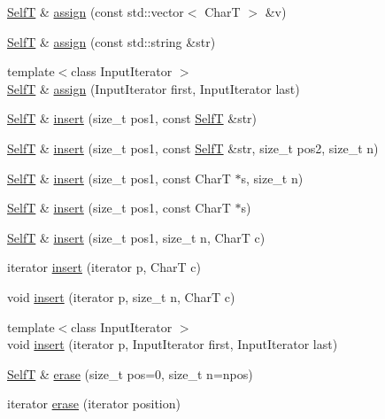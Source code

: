 \begin{CompactItemize}
\hyperlink{classbbt__string}{SelfT} \& \hyperlink{classbbt__string_4e5b4bef27753e3dacc0523ec42f4d7e}{assign} (const std::vector$<$ CharT $>$ \&v)
\item 
\hyperlink{classbbt__string}{SelfT} \& \hyperlink{classbbt__string_1d91c8aa0f24df605052b7bd2490bed4}{assign} (const std::string \&str)
\item 
{\footnotesize template$<$class InputIterator $>$ }\\\hyperlink{classbbt__string}{SelfT} \& \hyperlink{classbbt__string_fa0f90cc47b7fb7c8d4bf8a5aab3658d}{assign} (InputIterator first, InputIterator last)
\item 
\hyperlink{classbbt__string}{SelfT} \& \hyperlink{classbbt__string_259cc9a9e878740d80a1be9d770c8106}{insert} (size\_\-t pos1, const \hyperlink{classbbt__string}{SelfT} \&str)
\item 
\hyperlink{classbbt__string}{SelfT} \& \hyperlink{classbbt__string_fe7cd0b9d0f147a22424695cca30e463}{insert} (size\_\-t pos1, const \hyperlink{classbbt__string}{SelfT} \&str, size\_\-t pos2, size\_\-t n)
\item 
\hyperlink{classbbt__string}{SelfT} \& \hyperlink{classbbt__string_0912d29c711b1f67e066d6bbf1203adc}{insert} (size\_\-t pos1, const CharT $\ast$s, size\_\-t n)
\item 
\hyperlink{classbbt__string}{SelfT} \& \hyperlink{classbbt__string_3f5e4d3bbea5d9d55fe9fcb3185b7919}{insert} (size\_\-t pos1, const CharT $\ast$s)
\item 
\hyperlink{classbbt__string}{SelfT} \& \hyperlink{classbbt__string_414570f2f7f3afe8b105805a04f83e76}{insert} (size\_\-t pos1, size\_\-t n, CharT c)
\item 
iterator \hyperlink{classbbt__string_5eb3ddd3247398965c17324150398664}{insert} (iterator p, CharT c)
\item 
void \hyperlink{classbbt__string_94e32cc061b77d94d5ccdd33375ac649}{insert} (iterator p, size\_\-t n, CharT c)
\item 
{\footnotesize template$<$class InputIterator $>$ }\\void \hyperlink{classbbt__string_2720a0dd9a3b40ba8bda86d62a71c3c9}{insert} (iterator p, InputIterator first, InputIterator last)
\item 
\hyperlink{classbbt__string}{SelfT} \& \hyperlink{classbbt__string_21d1419fbc55b6276cb15a62b513106d}{erase} (size\_\-t pos=0, size\_\-t n=npos)
\item 
iterator \hyperlink{classbbt__string_5eac694c7f6e44c5018993eba8153e33}{erase} (iterator position)
\item 

\end{CompactItemize}
